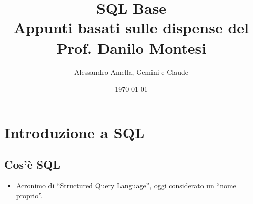 

\usepackage{hyperref}


\newcommand{\Rel}[1]{\textit{#1}} %
\newcommand{\Attr}[1]{\textsf{#1}} %

\newcommand{\myunion}{\cup}
\newcommand{\myintersection}{\cap}
\newcommand{\mydifference}{-}
\newcommand{\myrename}[2]{\rho_{#1}(#2)}
\newcommand{\myselectop}[2]{\sigma_{#1}(#2)}
\newcommand{\myproject}[2]{\pi_{#1}(#2)}
\newcommand{\mycartesian}{\times}
\newcommand{\mynaturaljoin}{\bowtie}
\newcommand{\mythetajoin}[3]{#1 \bowtie_{#2} #3}

\newcommand{\mylandop}{\wedge}
\newcommand{\myvel}{\vee}
\newcommand{\mynegop}{\neg}
\newcommand{\myforallop}{\forall}
\newcommand{\myexistsop}{\exists}

\def\ojoin{\setbox0=\hbox{$\mynaturaljoin$}%
	\rule[-.02ex]{.25em}{.4pt}\llap{\rule[\ht0]{.25em}{.4pt}}}
\newcommand{\myleftouterjoin}{\mathbin{\ojoin\mkern-5.8mu\mynaturaljoin}}
\newcommand{\myrightouterjoin}{\mathbin{\mynaturaljoin\mkern-5.8mu\ojoin}}
\newcommand{\myfullouterjoin}{\mathbin{\ojoin\mkern-5.8mu\mynaturaljoin\mkern-5.8mu\ojoin}}


\title{SQL Base\\
  \large Appunti basati sulle dispense del Prof. Danilo Montesi}
\author{Alessandro Amella, Gemini e Claude}
\date{\today}


	
	\maketitle
	\tableofcontents
	\newpage
	
	\section{Introduzione a SQL}
	
	\subsection{Cos'è SQL}
	\begin{itemize}
		\item Acronimo di ``Structured Query Language'', oggi considerato un ``nome proprio''.
	\end{itemize}
	
